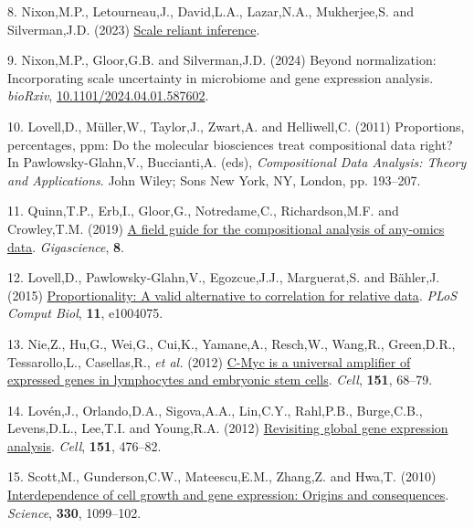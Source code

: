 \documentclass[
]{article}
\newlength{\cslhangindent}
\newenvironment{CSLReferences}[2] %
 {\begin{list}{}{%
  \setlength{\itemindent}{0pt}
  \setlength{\leftmargin}{0pt}
  \setlength{\parsep}{0pt}
  \ifodd #1
   \setlength{\leftmargin}{\cslhangindent}
   \setlength{\itemindent}{-1\cslhangindent}
  \fi
  \setlength{\itemsep}{#2\baselineskip}}}
 {\end{list}}
\begin{document}
\begin{CSLReferences}{1}{1}
8. Nixon,M.P., Letourneau,J., David,L.A., Lazar,N.A., Mukherjee,S. and
Silverman,J.D. (2023) \href{https://arxiv.org/abs/2201.03616}{Scale
reliant inference}.

9. Nixon,M.P., Gloor,G.B. and Silverman,J.D. (2024) Beyond
normalization: Incorporating scale uncertainty in microbiome and gene
expression analysis. \emph{bioRxiv},
\href{https://doi.org/10.1101/2024.04.01.587602}{10.1101/2024.04.01.587602}.

10. Lovell,D., Müller,W., Taylor,J., Zwart,A. and Helliwell,C. (2011)
Proportions, percentages, ppm: Do the molecular biosciences treat
compositional data right? In Pawlowsky-Glahn,V., Buccianti,A. (eds),
\emph{Compositional Data Analysis: Theory and Applications}. John Wiley;
Sons New York, NY, London, pp. 193--207.

11. Quinn,T.P., Erb,I., Gloor,G., Notredame,C., Richardson,M.F. and
Crowley,T.M. (2019) \href{https://doi.org/10.1093/gigascience/giz107}{A
field guide for the compositional analysis of any-omics data}.
\emph{Gigascience}, \textbf{8}.

12. Lovell,D., Pawlowsky-Glahn,V., Egozcue,J.J., Marguerat,S. and
Bähler,J. (2015)
\href{https://doi.org/10.1371/journal.pcbi.1004075}{Proportionality: A
valid alternative to correlation for relative data}. \emph{PLoS Comput
Biol}, \textbf{11}, e1004075.

13. Nie,Z., Hu,G., Wei,G., Cui,K., Yamane,A., Resch,W., Wang,R.,
Green,D.R., Tessarollo,L., Casellas,R., \emph{et al.} (2012)
\href{https://doi.org/10.1016/j.cell.2012.08.033}{C-{M}yc is a universal
amplifier of expressed genes in lymphocytes and embryonic stem cells}.
\emph{Cell}, \textbf{151}, 68--79.

14. Lovén,J., Orlando,D.A., Sigova,A.A., Lin,C.Y., Rahl,P.B.,
Burge,C.B., Levens,D.L., Lee,T.I. and Young,R.A. (2012)
\href{https://doi.org/10.1016/j.cell.2012.10.012}{Revisiting global gene
expression analysis}. \emph{Cell}, \textbf{151}, 476--82.

15. Scott,M., Gunderson,C.W., Mateescu,E.M., Zhang,Z. and Hwa,T. (2010)
\href{https://doi.org/10.1126/science.1192588}{Interdependence of cell
growth and gene expression: Origins and consequences}. \emph{Science},
\textbf{330}, 1099--102.


\end{CSLReferences}
\end{document}
